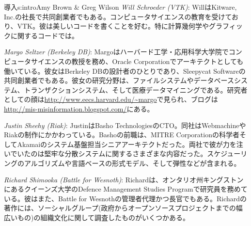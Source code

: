 \begin{aosachapter}{導入}{s:intro}{Amy Brown \& Greg Wilson}
\emph{Will Schroeder (VTK)}: WillはKitware, Inc.の社長で共同創業者でもある。コンピュータサイエンスの教育を受けており、VTK。彼は美しいコードを書くことを好む。特に計算幾何学やグラフィックに関するコードでは。

\emph{Margo Seltzer (Berkeley DB)}: Margoはハーバード工学・応用科学大学院でコンピュータサイエンスの教授を務め、Oracle Corporationでアーキテクトとしても働いている。彼女はBerkeley DBの設計者のひとりであり、Sleepycat Softwareの共同創業者でもある。彼女の研究分野は、ファイルシステムやデータベースシステム、トランザクションシステム、そして医療データマイニングである。研究者としての顔は\url{http://www.eecs.harvard.edu/~margo}で見られ、ブログは\url{http://mis-misinformation.blogspot.com/}にある。

\emph{Justin Sheehy (Riak)}: JustinはBasho TechnologiesのCTO。同社はWebmachineやRiakの制作にかかわっている。Bashoの前職は、MITRE Corporationの科学者そしてAkamaiのシステム基盤担当シニアアーキテクトだった。両社で彼が力を注いでいたのは堅牢な分散システムに関するさまざまな内容だった。スケジューリングのアルゴリズムや言語ベースの形式モデル、そして弾性などが含まれる。

\emph{Richard Shimooka (Battle for Wesnoth)}: Richardは、オンタリオ州キングストンにあるクイーンズ大学のDefence Management Studies Programで研究員を務めている。彼はまた、Battle for Wesnothの管理者代理かつ長官でもある。Richardの著作には、ソーシャルグループ(政府からオープンソースプロジェクトまでの幅広いもの)の組織文化に関して調査したものがいくつかある。


\end{aosachapter}
